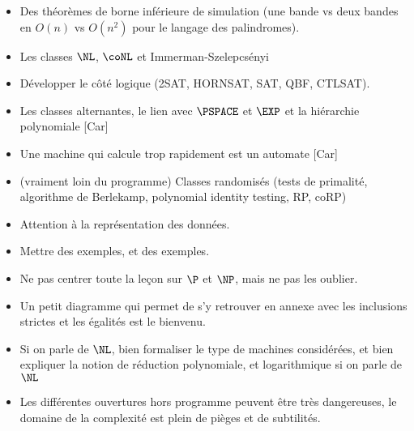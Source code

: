 \documentclass{agregfiche}
\begin{document}
\secidees

\begin{itemize}
    \item Des théorèmes de borne inférieure de simulation
(une bande vs deux bandes en $O(n)$ vs $O(n^2)$ 
pour le langage des palindromes).
    \item Les classes $\NL$, $\coNL$ et Immerman-Szelepcsényi
    \item Développer le côté logique (2SAT, HORNSAT, SAT, QBF, CTLSAT).
    \item Les classes alternantes, le lien avec 
        $\PSPACE$ et $\EXP$ et la hiérarchie polynomiale [Car]
    \item Une machine qui calcule trop rapidement est un automate 
        [Car]
    \item (vraiment loin du programme) Classes randomisés (tests de primalité, algorithme de Berlekamp,
        polynomial identity testing, RP, coRP)
     
\end{itemize}

\secpieges

\begin{itemize}
    \item Attention à la représentation des données.
    \item Mettre des exemples, et des exemples.
    \item Ne pas centrer toute la leçon sur $\P$ et $\NP$, mais ne pas les oublier.
  	\item Un petit diagramme qui permet de s'y retrouver 
    en annexe avec les inclusions strictes et les égalités est le bienvenu.
    \item Si on parle de $\NL$, bien formaliser le type de machines 
        considérées,  et bien expliquer la notion de réduction polynomiale,
        et logarithmique si on parle de $\NL$
    \item Les différentes ouvertures hors programme peuvent être très dangereuses, le domaine de la complexité est plein de pièges et de subtilités.
    

\end{itemize}


\secquestionsclassiques
\end{document}
